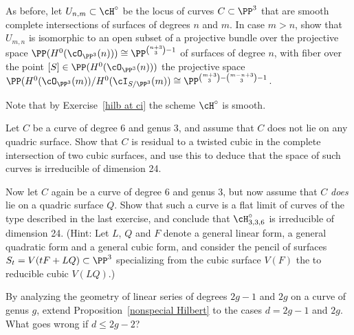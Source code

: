 \begin{exercise}\label{second complete intersection exercise}
As before, let $U_{n,m} \subset \cH^\circ$ be the locus of curves $C \subset \PP^3$ that are smooth complete intersections of surfaces of degrees $n$ and $m$.
 In case $m > n$, show that $U_{m,n}$ is isomorphic to an open subset of a projective bundle over the projective space $\PP(H^0(\cO_{\PP^3}(n))) \cong \PP^{\binom{n+3}{3}-1}$ of surfaces of degree $n$, with fiber over the point $[S] \in \PP(H^0(\cO_{\PP^3}(n)))$ the projective space $\PP(H^0(\cO_{\PP^3}(m))/H^0(\cI_{S/\PP^3}(m)) \cong \PP^{\binom{m+3}{3} - \binom{m-n+3}{3} - 1}$.
 
 Note that  by Exercise~\ref{hilb at ci}  the scheme $\cH^\circ$ is smooth.
\end{exercise}

\begin{exercise}\label{6,3:1}
Let $C$ be a curve of degree 6 and genus 3, and assume that $C$ does not lie on any quadric surface. Show that $C$ is residual to a twisted cubic in the complete intersection of two cubic surfaces, and use this to deduce that the space of such curves is irreducible of dimension 24.
\end{exercise}


\begin{exercise}\label{6,3:2}
Now let $C$ again be a curve of degree 6 and genus 3, but now assume that $C$ \emph{does} lie on a quadric surface $Q$. Show that such a curve is a flat limit of curves of the type described in the last exercise, and conclude that $\cH^\circ_{3,3,6}$ is irreducible of dimension 24. (Hint: Let $L$, $Q$ and $F$ denote a general linear form, a general quadratic form and a general cubic form, and consider the pencil of surfaces $S_t = V(tF + LQ) \subset \PP^3$ specializing from the cubic surface $V(F)$ the to reducible cubic $V(LQ)$.)
\end{exercise}

\begin{exercise}
By analyzing the geometry of linear series of degrees $2g-1$ and $2g$ on a curve of genus $g$, extend Proposition~\ref{nonspecial Hilbert} to the cases $d = 2g-1$ and $2g$. What goes wrong if $d \leq 2g-2$?
\end{exercise}

